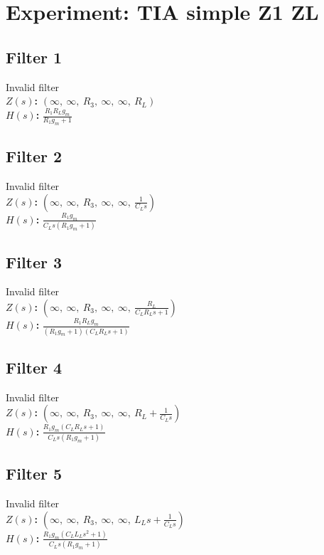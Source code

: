 \documentclass{article}
\begin{document}
        \section*{Experiment: TIA simple Z1 ZL}
\subsection*{Filter 1}
Invalid filter \\ 
\textbf{$Z(s)$:} $\left( \infty, \  \infty, \  R_{3}, \  \infty, \  \infty, \  R_{L}\right)$ \\ 
\textbf{$H(s)$:} $\frac{R_{1} R_{L} g_{m}}{R_{1} g_{m} + 1}$ \\ 
\subsection*{Filter 2}
Invalid filter \\ 
\textbf{$Z(s)$:} $\left( \infty, \  \infty, \  R_{3}, \  \infty, \  \infty, \  \frac{1}{C_{L} s}\right)$ \\ 
\textbf{$H(s)$:} $\frac{R_{1} g_{m}}{C_{L} s \left(R_{1} g_{m} + 1\right)}$ \\ 
\subsection*{Filter 3}
Invalid filter \\ 
\textbf{$Z(s)$:} $\left( \infty, \  \infty, \  R_{3}, \  \infty, \  \infty, \  \frac{R_{L}}{C_{L} R_{L} s + 1}\right)$ \\ 
\textbf{$H(s)$:} $\frac{R_{1} R_{L} g_{m}}{\left(R_{1} g_{m} + 1\right) \left(C_{L} R_{L} s + 1\right)}$ \\ 
\subsection*{Filter 4}
Invalid filter \\ 
\textbf{$Z(s)$:} $\left( \infty, \  \infty, \  R_{3}, \  \infty, \  \infty, \  R_{L} + \frac{1}{C_{L} s}\right)$ \\ 
\textbf{$H(s)$:} $\frac{R_{1} g_{m} \left(C_{L} R_{L} s + 1\right)}{C_{L} s \left(R_{1} g_{m} + 1\right)}$ \\ 
\subsection*{Filter 5}
Invalid filter \\ 
\textbf{$Z(s)$:} $\left( \infty, \  \infty, \  R_{3}, \  \infty, \  \infty, \  L_{L} s + \frac{1}{C_{L} s}\right)$ \\ 
\textbf{$H(s)$:} $\frac{R_{1} g_{m} \left(C_{L} L_{L} s^{2} + 1\right)}{C_{L} s \left(R_{1} g_{m} + 1\right)}$ \\ 
\end{document}
